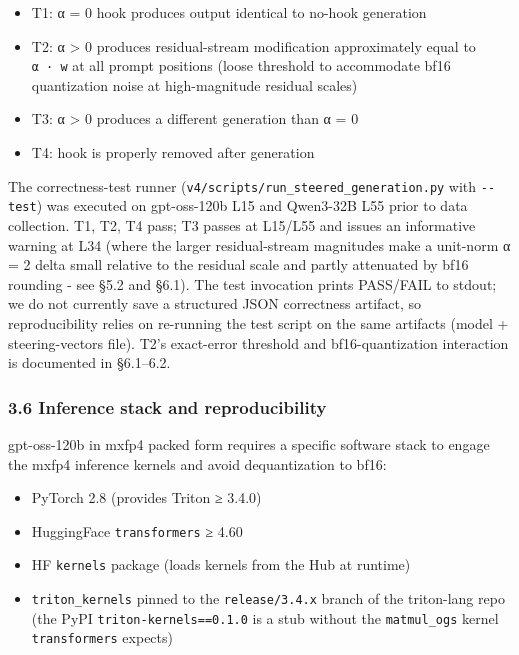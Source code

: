 \documentclass[
]{article}
\providecommand{\tightlist}{%
  \setlength{\itemsep}{0pt}\setlength{\parskip}{0pt}}
\begin{document}
\begin{itemize}
\tightlist
\item
  T1: α = 0 hook produces output identical to no-hook generation
\item
  T2: α \textgreater{} 0 produces residual-stream modification
  approximately equal to \texttt{α\ ·\ w} at all prompt positions (loose
  threshold to accommodate bf16 quantization noise at high-magnitude
  residual scales)
\item
  T3: α \textgreater{} 0 produces a different generation than α = 0
\item
  T4: hook is properly removed after generation
\end{itemize}

The correctness-test runner
(\texttt{v4/scripts/run\_steered\_generation.py} with \texttt{-\/-test})
was executed on gpt-oss-120b L15 and Qwen3-32B L55 prior to data
collection. T1, T2, T4 pass; T3 passes at L15/L55 and issues an
informative warning at L34 (where the larger residual-stream magnitudes
make a unit-norm α = 2 delta small relative to the residual scale and
partly attenuated by bf16 rounding - see §5.2 and §6.1). The test
invocation prints PASS/FAIL to stdout; we do not currently save a
structured JSON correctness artifact, so reproducibility relies on
re-running the test script on the same artifacts (model +
steering-vectors file). T2's exact-error threshold and bf16-quantization
interaction is documented in §6.1--6.2.

\subsubsection{3.6 Inference stack and
reproducibility}\label{inference-stack-and-reproducibility}

gpt-oss-120b in mxfp4 packed form requires a specific software stack to
engage the mxfp4 inference kernels and avoid dequantization to bf16:

\begin{itemize}
\tightlist
\item
  PyTorch 2.8 (provides Triton ≥ 3.4.0)
\item
  HuggingFace \texttt{transformers} ≥ 4.60
\item
  HF \texttt{kernels} package (loads kernels from the Hub at runtime)
\item
  \texttt{triton\_kernels} pinned to the \texttt{release/3.4.x} branch
  of the triton-lang repo (the PyPI \texttt{triton-kernels==0.1.0} is a
  stub without the \texttt{matmul\_ogs} kernel \texttt{transformers}
  expects)
\end{itemize}
\end{document}
